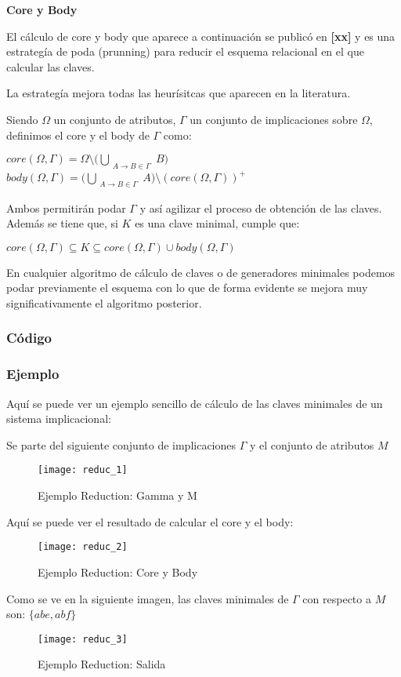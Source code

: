 \textbf{Core y Body}

El c\'alculo de core y body que aparece a continuaci\'on se public\'o en \textbf{[xx]} y es una estrateg\'ia de poda (prunning) para reducir el esquema relacional en el que calcular las claves. 

La estrateg\'ia mejora todas las heur\'isitcas que aparecen en la literatura. 

Siendo \(\Omega\) un conjunto de atributos, \(\Gamma\) un conjunto de implicaciones sobre \(\Omega\), definimos el core y el body de \(\Gamma\) como:
\begin{center}
    \(core(\Omega,\Gamma) = \Omega \setminus \big(\bigcup_{\substack{A \to B \in \Gamma}} B\big) \ \ \ \ \)
    \(body(\Omega,\Gamma) = \big(\bigcup_{\substack{A \to B \in \Gamma}} A\big) \setminus (core(\Omega,\Gamma))^+\)
\end{center}
Ambos permitir\'an podar \(\Gamma\) y as\'i agilizar el proceso de obtenci\'on de las claves. Adem\'as se tiene que, si \(K\) es una clave minimal, cumple que: 
\begin{center}
    \(core(\Omega,\Gamma) \subseteq K \subseteq core(\Omega,\Gamma) \cup body(\Omega,\Gamma)\)
\end{center}

En cualquier algoritmo de c\'alculo de claves o de generadores minimales podemos podar previamente el esquema con lo que de forma evidente se mejora muy significativamente el algoritmo posterior.

\newpage
\subsubsection{C\'odigo} 

\newpage


\newpage
\subsubsection{Ejemplo} 
Aqu\'i se puede ver un ejemplo sencillo de c\'alculo de las claves minimales de un sistema implicacional:

Se parte del siguiente conjunto de implicaciones \(\Gamma\) y el conjunto de atributos \(M\)
\begin{figure}[H]
    \centering
    \texttt{[image: reduc\_1]}
    \caption{Ejemplo Reduction: Gamma y M}
    \label{fig:reduc_1}
\end{figure}
Aqu\'i se puede ver el resultado de calcular el core y el body:
\begin{figure}[H]
    \centering
    \texttt{[image: reduc\_2]}
    \caption{Ejemplo Reduction: Core y Body}
    \label{fig:reduc_2}
\end{figure}
Como se ve en la siguiente imagen, las claves minimales de \(\Gamma\) con respecto a \(M\) son: \(\{abe,abf\}\)
\begin{figure}[H]
    \centering
    \texttt{[image: reduc\_3]}
    \caption{Ejemplo Reduction: Salida}
    \label{fig:reduc_3}
\end{figure}

